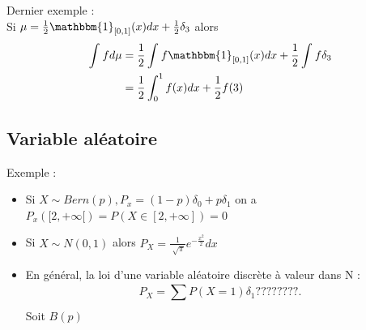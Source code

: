 \documentclass{article}
\theoremstyle{plain}%
\theoremstyle{definition}
\theoremstyle{remark}
\begin{document}
Dernier exemple : \\
Si  $ \mu  = \frac{1}{2} \mathbbm{1}_{[0,1]}(x)dx + \frac{1}{2} \delta _3  $ alors \begin{align*}
    \int_{}^{}fd \mu &= \frac{1}{2} \int_{}^{}f \mathbbm{1}_{[0,1]}(x) dx  + \frac{1}{2} \int_{}^{}f \delta _3 \\
                    &= \frac{1}{2} \int_{0}^{1} f(x)dx + \frac{1}{2} f(3)
\end{align*} 

\subsection{Variable aléatoire}
Exemple : \begin{itemize}
    \item Si  $ X \sim Bern(p), P_x = (1-p) \delta _0 + p \delta _1$ on a  $ P_x([2,+ \infty[) = P(X \in [2, + \infty ]) = 0 $  
    \item Si  $ X \sim  N(0,1) $ alors  $ P_X = \frac{1}{\sqrt[]{\pi }}e^{-\frac{x^2}{2}} dx $ 
    \item En général, la loi d'une variable aléatoire discrète à valeur dans N : 
    \[
        P_X = \sum_{}^{} P(X=1) \delta _1 ????????
    .\]
    Soit  $ B(p) $ 
\end{itemize}
\end{document}
